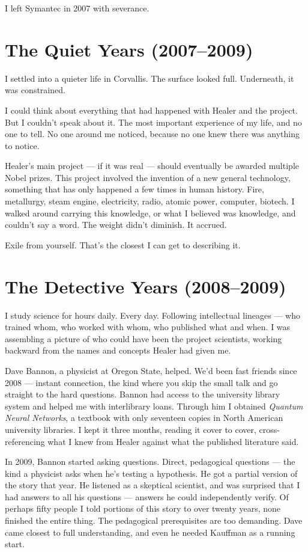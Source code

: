 I left Symantec in 2007 with severance.
\section*{The Quiet Years (2007--2009)}
\label{pos29:the-quiet-years}

I settled into a quieter life in Corvallis. The surface looked full. Underneath, it was constrained.

I could think about everything that had happened with Healer and the project. But I couldn't speak about it. The most important experience of my life, and no one to tell. No one around me noticed, because no one knew there was anything to notice.

Healer's main project --- if it was real --- should eventually be awarded multiple Nobel prizes. This project involved the invention of a new general technology, something that has only happened a few times in human history. Fire, metallurgy, steam engine, electricity, radio, atomic power, computer, biotech. I walked around carrying this knowledge, or what I believed was knowledge, and couldn't say a word. The weight didn't diminish. It accrued.

Exile from yourself. That's the closest I can get to describing it.

\section*{The Detective Years (2008--2009)}
\label{pos29:the-detective-years}

I study science for hours daily. Every day. Following intellectual lineages --- who trained whom, who worked with whom, who published what and when. I was assembling a picture of who could have been the project scientists, working backward from the names and concepts Healer had given me.

Dave Bannon, a physicist at Oregon State, helped. We'd been fast friends since 2008 --- instant connection, the kind where you skip the small talk and go straight to the hard questions. Bannon had access to the university library system and helped me with interlibrary loans. Through him I obtained \textit{Quantum Neural Networks}, a textbook with only seventeen copies in North American university libraries. I kept it three months, reading it cover to cover, cross-referencing what I knew from Healer against what the published literature said.

In 2009, Bannon started asking questions. Direct, pedagogical questions --- the kind a physicist asks when he's testing a hypothesis. He got a partial version of the story that year. He listened as a skeptical scientist, and was surprised that I had answers to all his questions --- answers he could independently verify. Of perhaps fifty people I told portions of this story to over twenty years, none finished the entire thing. The pedagogical prerequisites are too demanding. Dave came closest to full understanding, and even he needed Kauffman as a running start.

